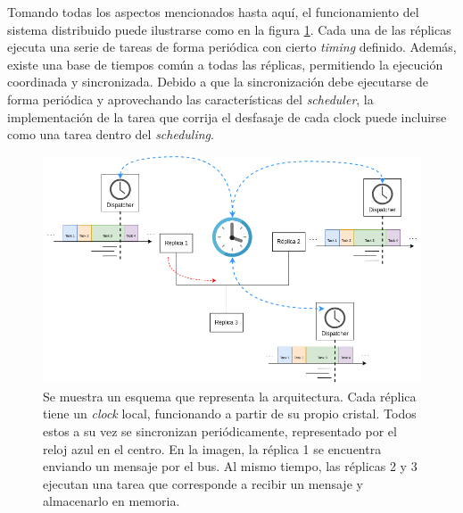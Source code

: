 Tomando todas los aspectos mencionados hasta aquí, el funcionamiento del sistema distribuido puede ilustrarse como en la figura \ref{fig:diagrama_TTA}. Cada una de las réplicas ejecuta una serie de tareas de forma periódica con cierto \textit{timing} definido. Además, existe una base de tiempos común a todas las réplicas, permitiendo la ejecución coordinada y sincronizada. Debido a que la sincronización debe ejecutarse de forma periódica y aprovechando las características del \textit{scheduler}, la implementación de la tarea que corrija el desfasaje de cada clock puede incluirse como una tarea dentro del \textit{scheduling}.


\begin{figure}[htb]
    \centering
    \includegraphics[width=\textwidth]{img/diagrama_TTA.png}
    \caption{Se muestra un esquema que representa la arquitectura. Cada réplica tiene un \textit{clock} local, funcionando a partir de su propio cristal. Todos estos a su vez se sincronizan periódicamente, representado por el reloj azul en el centro. En la imagen, la réplica 1 se encuentra enviando un mensaje por el bus. Al mismo tiempo, las réplicas 2 y 3 ejecutan una tarea que corresponde a recibir un mensaje y almacenarlo en memoria.}
    \label{fig:diagrama_TTA}
\end{figure}






